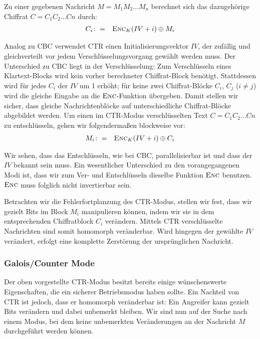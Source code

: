 \noindent Zu einer gegebenen Nachricht \(M = M_1M_2 \dots M_n\) berechnet sich das dazugehörige Chiffrat \(C = C_1C_2 \dots Cn\) durch:
\begin{eqnarray*}
	C_i	& \colon=	& \textsc{Enc}_{K}(IV + i) \oplus M_i
\end{eqnarray*}

Analog zu CBC verwendet CTR einen Initialisierungsvektor \(IV\), der zufällig und gleichverteilt vor jedem Verschlüsselungsvorgang gewählt werden muss. Der Unterschied zu CBC liegt in der Verschlüsselung: Zum Verschlüsseln eines Klartext-Blocks wird kein vorher berechneter Chiffrat-Block benötigt. Stattdessen wird für jedes \(C_i\) der \(IV\) um 1 erhöht; für keine zwei Chiffrat-Blöcke \(C_i\), \(C_j\) (\(i \neq j\)) wird die gleiche Eingabe an die \(\textsc{Enc}\)-Funktion übergeben. Damit stellen wir sicher, dass gleiche Nachrichtenblöcke auf unterschiedliche Chiffrat-Blöcke abgebildet werden. Um einen im CTR-Modus verschlüsselten Text \(C = C_1C_2 \dots Cn\) zu entschlüsseln, gehen wir folgendermaßen blockweise vor:
\begin{eqnarray*}
	M_i	& \colon=	& \textsc{Enc}_{K}(IV + i) \oplus C_i
\end{eqnarray*}

Wir sehen, dass das Entschlüsseln, wie bei CBC, parallelisierbar ist und dass der \(IV\) bekannt sein muss. Ein wesentlicher Unterschied zu den vorangegangenen Modi ist, dass wir zum Ver- und Entschlüsseln dieselbe Funktion \(\textsc{Enc}\) benutzen. \(\textsc{Enc}\) muss folglich nicht invertierbar sein.

Betrachten wir die Fehlerfortplanzung des CTR-Modus, stellen wir fest, dass wir gezielt Bits im Block \(M_i\) manipulieren können, indem wir sie in dem entsprechenden Chiffratblock \(C_i\) verändern. Mittels CTR verschlüsselte Nachrichten sind somit homomorph veränderbar. Wird hingegen der gewählte \(IV\) verändert, erfolgt eine komplette Zerstörung der ursprünglichen Nachricht. 

\subsubsection{Galois/Counter Mode}

Der oben vorgestellte CTR-Modus besitzt bereits einige wünschenswerte Eigenschaften, die ein sicherer Betriebsmodus haben sollte. Ein Nachteil von CTR ist jedoch, dass er homomorph veränderbar ist: Ein Angreifer kann gezielt Bits verändern und dabei unbemerkt bleiben. Wir sind nun auf der Suche nach einem Modus, bei dem keine unbemerkten Veränderungen an der Nachricht \(M\) durchgeführt werden können.

